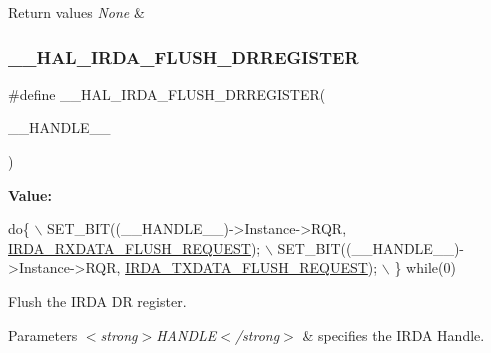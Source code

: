\begin{DoxyRetVals}{Return values}
{\em None} & \\
\hline
\end{DoxyRetVals}
\mbox{\label{group___i_r_d_a___exported___macros_ga0c097de13209ede853a30d511cf5a00e}} 
\subsubsection{\texorpdfstring{\+\_\+\+\_\+\+H\+A\+L\+\_\+\+I\+R\+D\+A\+\_\+\+F\+L\+U\+S\+H\+\_\+\+D\+R\+R\+E\+G\+I\+S\+T\+ER}{\_\_HAL\_IRDA\_FLUSH\_DRREGISTER}}
{\footnotesize\ttfamily \#define \+\_\+\+\_\+\+H\+A\+L\+\_\+\+I\+R\+D\+A\+\_\+\+F\+L\+U\+S\+H\+\_\+\+D\+R\+R\+E\+G\+I\+S\+T\+ER(\begin{DoxyParamCaption}\item[{}]{\+\_\+\+\_\+\+H\+A\+N\+D\+L\+E\+\_\+\+\_\+ }\end{DoxyParamCaption})}

{\bfseries Value\+:}
\begin{DoxyCode}
\textcolor{keywordflow}{do}\{                                                                    \(\backslash\)
         SET\_BIT((\_\_HANDLE\_\_)->Instance->RQR, \hyperlink{group___i_r_d_a___request___parameters_gade40b479c4ee0227c2851e7eb3f0f930}{IRDA\_RXDATA\_FLUSH\_REQUEST}); \(\backslash\)
         SET\_BIT((\_\_HANDLE\_\_)->Instance->RQR, \hyperlink{group___i_r_d_a___request___parameters_ga15f0617bb3c52ca8936f1d9127274ac9}{IRDA\_TXDATA\_FLUSH\_REQUEST}); \(\backslash\)
      \} \textcolor{keywordflow}{while}(0)
\end{DoxyCode}


Flush the I\+R\+DA DR register. 


\begin{DoxyParams}{Parameters}
{\em $<$strong$>$\+H\+A\+N\+D\+L\+E$<$/strong$>$} & specifies the I\+R\+DA Handle. \\
\hline
\end{DoxyParams}

